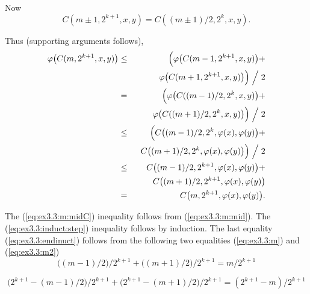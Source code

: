 \begin{enumerate}
  Now
  \begin{equation*}
   C(m\pm 1,2^{k+1},x,y) =  C((m\pm 1)/2,2^k,x,y).
  \end{equation*}

  Thus (supporting arguments follows),
  \begin{eqnarray}
     \varphi\bigl(C(m,2^{k+1},x,y)\bigr)
    &\leq& \label{eq:ex3.3:m:midC}
          \Bigl(
          \varphi\bigl(C(m-1,2^{k+1},x,y)\bigr) + \\
    && \phantom{\Bigl(}
          \varphi\bigl(C(m+1,2^{k+1},x,y)\bigr) \Bigr) \Bigm/ 2 \notag \\
    &=&
          \Bigl(
          \varphi\bigl(C((m-1)/2,2^k,x,y)\bigr) + \notag \\
    && \phantom{\Bigl(}
          \varphi\bigl(C((m+1)/2,2^k,x,y)\bigr) \Bigr) \Bigm/ 2
          \notag \\
    &\leq & \label{eq:ex3.3:induct:step}
     \Bigl(
             C\bigl((m-1)/2,2^k,\varphi(x),\varphi(y)\bigr) + \\
    &&  \phantom{\Bigl(}
             C\bigl((m+1)/2,2^k,\varphi(x),\varphi(y)\bigr) \Bigr) \Bigm/ 2
             \notag \\
    &\leq &  C\bigl((m-1)/2,2^{k+1},\varphi(x),\varphi(y)\bigr) + \notag \\
    &&       C\bigl((m+1)/2,2^{k+1},\varphi(x),\varphi(y)\bigr) \notag \\
    &= &     \label{eq:ex3.3:endinuct}
             C\bigl(m,2^{k+1},\varphi(x),\varphi(y)\bigr).
  \end{eqnarray}

The (\ref{eq:ex3.3:m:midC}) inequality follows from (\ref{eq:ex3.3:m:mid}).
The (\ref{eq:ex3.3:induct:step}) inequality follows by induction.
The last equality (\ref{eq:ex3.3:endinuct}) follows from the following
two equalities (\ref{eq:ex3.3:m}) and (\ref{eq:ex3.3:m2})
\begin{equation} \label{eq:ex3.3:m}
 \bigl((m-1)/2\bigr)/ 2^{k+1} +
 \bigl((m+1)/2\bigr)/ 2^{k+1} =
  m / 2^{k+1}
\end{equation}

\begin{equation}\label{eq:ex3.3:m2}
 \bigl(2^{k+1}-(m-1)/2\bigr)/ 2^{k+1} +
 \bigl(2^{k+1}-(m+1)/2\bigr)/ 2^{k+1} =
      (2^{k+1}-m) / 2^{k+1}
\end{equation}


\end{enumerate}
